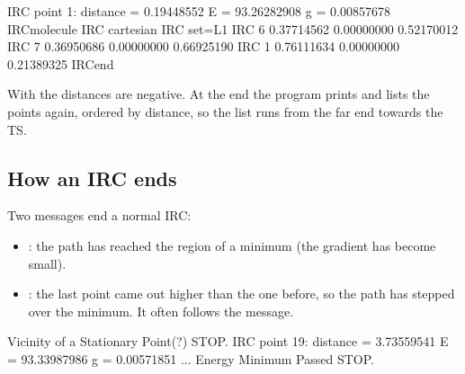 \documentclass[letterpaper,10pt,english,openany,oneside]{sphinxmanual}
\begin{document}
\begin{sphinxVerbatim}[commandchars=\\\{\}]
IRC\PYGZgt{} point   1: distance =   0.19448552 E =   \PYGZhy{}93.26282908 g = 0.00857678
IRC\PYGZgt{}\PYGZdl{}molecule
IRC\PYGZgt{} cartesian
IRC\PYGZgt{} set=L1
IRC\PYGZgt{}   6    \PYGZhy{}0.37714562   0.00000000  \PYGZhy{}0.52170012
IRC\PYGZgt{}   7    \PYGZhy{}0.36950686   0.00000000   0.66925190
IRC\PYGZgt{}   1     0.76111634   0.00000000  \PYGZhy{}0.21389325
IRC\PYGZgt{}\PYGZdl{}end
\end{sphinxVerbatim}



\sphinxAtStartPar
With  the distances are negative. At the end the program prints  and lists the points
again, ordered by distance, so the  list runs from the far end towards the TS.




\subsection{How an IRC ends}
\label{\detokenize{tasks/ts-irc-scan:how-an-irc-ends}}
\sphinxAtStartPar
Two messages end a normal IRC:
\begin{itemize}
\item {} 
\sphinxAtStartPar
{}: the path has reached the region of a minimum (the gradient has
become small).

\item {} 
\sphinxAtStartPar
{}: the last point came out higher than the one before, so the path has stepped
over the minimum. It often follows the  message.

\end{itemize}

\begin{sphinxVerbatim}[commandchars=\\\{\}]
 Vicinity of a Stationary Point(?) \PYGZhy{}\PYGZhy{}\PYGZhy{} STOP.
IRC\PYGZgt{} point  19: distance =   3.73559541 E =   \PYGZhy{}93.33987986 g = 0.00571851
...
 Energy Minimum Passed \PYGZhy{}\PYGZhy{}\PYGZhy{} STOP.
\end{sphinxVerbatim}
\end{document}
